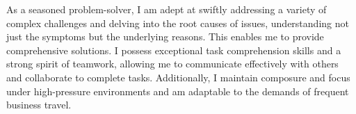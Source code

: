

\begin{cvparagraph}
	As a seasoned problem-solver, I am adept at swiftly addressing a variety of complex challenges and delving into the root causes of issues, understanding not just the symptoms but the underlying reasons. This enables me to provide comprehensive solutions. I possess exceptional task comprehension skills and a strong spirit of teamwork, allowing me to communicate effectively with others and collaborate to complete tasks. Additionally, I maintain composure and focus under high-pressure environments and am adaptable to the demands of frequent business travel.
\end{cvparagraph}
